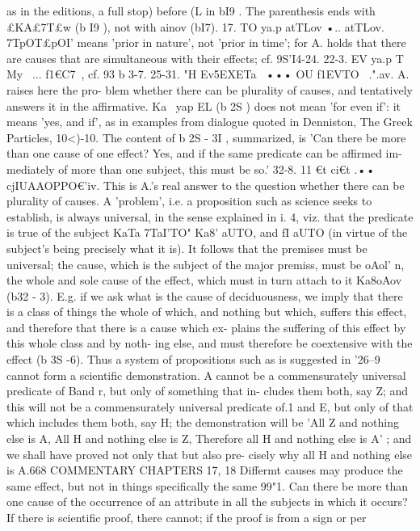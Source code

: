 {{{{{{{{{{{{{{{{{{{{{{{{{{{{{{{{{{{{{{{{{{{{{{{{{{{{{{{{{{{{{{{{{{{{{{as in the editions, a full stop) before (L in bI9 . The parenthesis
ends with £KA£{7T£w (b I9 ), not with ainov (bI7).
17. TO ya.p atTLov •.. atTLov. 7TpOT£pOI' means 'prior in nature',
not 'prior in time'; for A. holds that there are causes that are
simultaneous with their effects; cf. 9S'I4-24.
22-3. EV ya.p T~ My~ ... f1€C7~, cf. 93 b 3-7.
25-31. "H Ev5EXETa~ ••• OU f1EVTO~ .".av. A. raises here the pro-
blem whether there can be plurality of causes, and tentatively
answers it in the affirmative. Ka~ yap EL (b 2S ) does not mean 'for
even if': it means 'yes, and if', as in examples from dialogue
quoted in Denniston, The Greek Particles, 10<)-10. The content of
b 2S - 3I , summarized, is 'Can there be more than one cause of
one effect? Yes, and if the same predicate can be affirmed im-
mediately of more than one subject, this must be so.'
32-8. 11 €t ci€t .•• cjIUAAOPPO€'iv. This is A.'s real answer to the
question whether there can be plurality of causes. A 'problem',
i.e. a proposition such as science seeks to establish, is always
universal, in the sense explained in i. 4, viz. that the predicate
is true of the subject KaTa 7TaI'TO" Ka8' aUTO, and fI aUTO (in virtue
of the subject's being precisely what it is). It follows that the
premises must be universal; the cause, which is the subject of
the major premiss, must be oAol' n, the whole and sole cause of
the effect, which must in turn attach to it Ka8oAov (b32 - 3). E.g.
if we ask what is the cause of deciduousness, we imply that there
is a class of things the whole of which, and nothing but which,
suffers this effect, and therefore that there is a cause which ex-
plains the suffering of this effect by this whole class and by noth-
ing else, and must therefore be coextensive with the effect (b 3S -6).
Thus a system of propositions such as is suggested in '26--9 cannot
form a scientific demonstration. A cannot be a commensurately
universal predicate of Band r, but only of something that in-
cludes them both, say Z; and this will not be a commensurately
universal predicate of.1 and E, but only of that which includes
them both, say H; the demonstration will be 'All Z and nothing
else is A, All H and nothing else is Z, Therefore all H and nothing
else is A' ; and we shall have proved not only that but also pre-
cisely why all H and nothing else is A.668
COMMENTARY
CHAPTERS 17, 18
Differmt causes may produce the same effect, but not in things
specifically the same
99"1. Can there be more than one cause of the occurrence of
an attribute in all the subjects in which it occurs? If there is
scientific proof, there cannot; if the proof is from a sign or per
}}}}}}}}}}}}}}}}}}}}}}}}}}}}}}}}}}}}}}}}}}}}}}}}}}}}}}}}}}}}}}}}}}}}}}}
